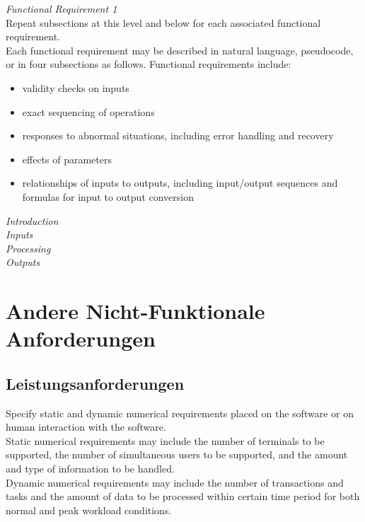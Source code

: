 \noindent \textit{\large Functional Requirement 1} \\
Repeat subsections at this level and below for each associated functional requirement. \\[-0.3cm]

\noindent Each functional requirement may be described in natural language, pseudocode, or in four subsections as follows. Functional requirements include:
\begin{itemize}
	\item validity checks on inputs
	\item exact sequencing of operations
	\item responses to abnormal situations, including error handling and recovery
	\item effects of parameters
	\item relationships of inputs to outputs, including input/output sequences and formulas for input to output
conversion
\end{itemize}

\noindent \textit{\large Introduction} \\
\textit{\large Inputs} \\
\textit{\large Processing} \\
\textit{\large Outputs} \\

\newpage

\section{Andere Nicht-Funktionale Anforderungen}

\subsection{Leistungsanforderungen}
Specify static and dynamic numerical requirements placed on the software or on human interaction with the software. \\[-0.3cm]

\noindent Static numerical requirements may include the number of terminals to be supported, the number of simultaneous users to be supported, and the amount and type of information to be handled. \\[-0.3cm]

\noindent Dynamic numerical requirements may include the number of transactions and tasks and the amount of data to be processed within certain time period for both normal and peak workload conditions.

